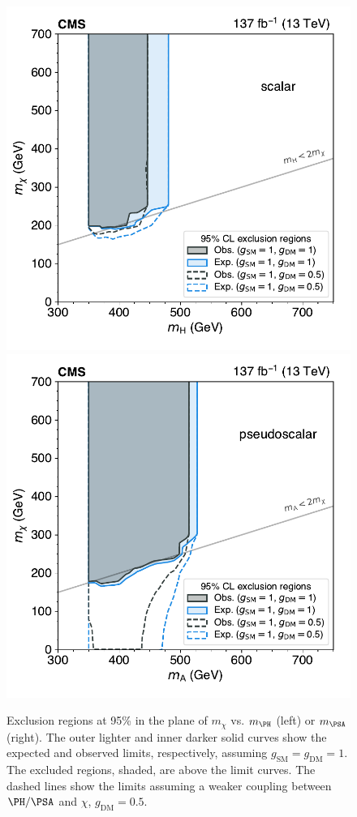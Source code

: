 \begin{figure}[!hbtp]
\centering
    \includegraphics[width=.49\textwidth]{figs/ftp/plot_2d_dmscalar_xsec_totsm_bothcouplings.pdf}
    \includegraphics[width=.49\textwidth]{figs/ftp/plot_2d_dmpseudo_xsec_totsm_bothcouplings.pdf}
\caption{
	Exclusion regions at 95\% \CL in the plane of $m_\chi$ vs. $m_{\PH}$ (left) or $m_{\PSA}$ (right).
    The outer lighter and inner darker solid curves show the expected and observed limits, respectively,
    assuming $g_\mathrm{SM} = g_\mathrm{DM} = 1$. The excluded regions, shaded, are above the limit curves.
    The dashed lines show the limits assuming a weaker coupling between $\PH/\PSA$ and $\chi$, $g_\mathrm{DM} = 0.5$.
    }
\label{fig:DMLimits}
\end{figure}
